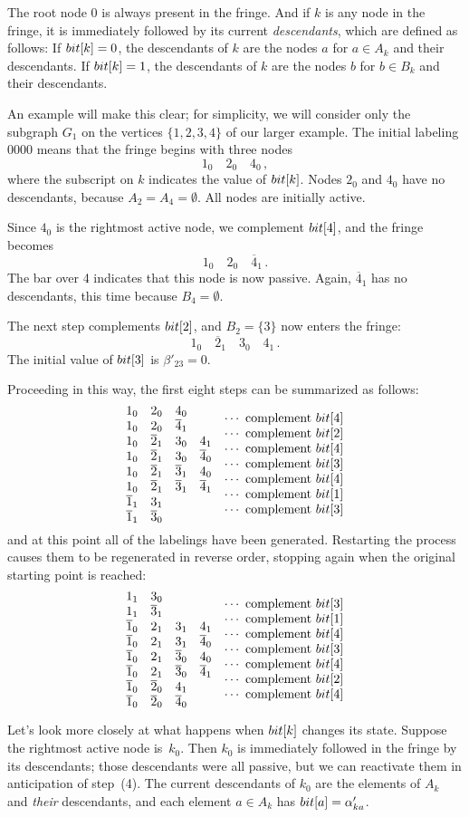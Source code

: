 The root node 0 is always present in the fringe.
And if $k$ is any node in the fringe, it is immediately followed
by its current {\it descendants}, which are defined as follows:
If $\\{bit}[k]=0$, the descendants of $k$ are the nodes $a$ for $a\in A_k$
and their descendants. If $\\{bit}[k]=1$, the descendants of $k$ are the nodes
$b$ for $b\in B_k$ and their descendants.

\fi

An example will make this clear; for simplicity, we will consider only
the subgraph $G_1$ on the vertices $\{1,2,3,4\}$ of our larger example.
The initial labeling 0000 means that the fringe begins with three nodes
$$1_0\quad 2_0\quad 4_0\,,$$
where the subscript on $k$ indicates the value of $\\{bit}[k]$. Nodes
$2_0$ and $4_0$ have no descendants, because $A_2=A_4=\emptyset$.
All nodes are initially active.

\def\p#1{\overline#1}
Since $4_0$ is the rightmost active node, we complement $\\{bit}[4]$, and
the fringe becomes
$$1_0\quad 2_0\quad \p4_1\,.$$
The bar over 4 indicates that this node is now passive. Again, $\p4_1$
has no descendants, this time because $B_4=\emptyset$.

The next step complements $\\{bit}[2]$, and $B_2=\{3\}$ now enters the fringe:
$$1_0\quad \p2_1\quad 3_0\quad 4_1\,.$$
The initial value of $\\{bit}[3]$ is $\beta'_{23}=0$.

\fi

Proceeding in this way,
the first eight steps can be summarized as follows:
$$\vbox{\halign{$#\hfil$&
\quad\smash{\lower.5\baselineskip\hbox{$\cdots$ complement $\bit#$\hfil}}\cr
1_0\quad 2_0\quad 4_0&4\cr
1_0\quad 2_0\quad \p4_1&2\cr
1_0\quad \p2_1\quad 3_0\quad 4_1&4\cr
1_0\quad \p2_1\quad 3_0\quad \p4_0&3\cr
1_0\quad \p2_1\quad \p3_1\quad 4_0&4\cr
1_0\quad \p2_1\quad \p3_1\quad \p4_1&1\cr
\p1_1\quad 3_1&3\cr
\p1_1\quad \p3_0\cr}}$$
and at this point all of the labelings have been generated.
Restarting the process causes
them to be regenerated in reverse order, stopping again when the original
starting point is reached:
$$\vbox{\halign{$#\hfil$&
\quad\smash{\lower.5\baselineskip\hbox{$\cdots$ complement $\bit#$\hfil}}\cr
1_1\quad 3_0&3\cr
1_1\quad \p3_1&1\cr
\p1_0\quad 2_1\quad 3_1\quad 4_1&4\cr
\p1_0\quad 2_1\quad 3_1\quad \p4_0&3\cr
\p1_0\quad 2_1\quad \p3_0\quad 4_0&4\cr
\p1_0\quad 2_1\quad \p3_0\quad \p4_1&2\cr
\p1_0\quad \p2_0\quad 4_1&4\cr
\p1_0\quad \p2_0\quad \p4_0\cr}}$$

\fi

Let's look more closely at what happens when $\\{bit}[k]$ changes its state.
Suppose the rightmost active node is~$k_0$. Then $k_0$ is immediately followed
in the fringe by its descendants; those descendants were all passive, but
we can reactivate them in anticipation of step~(4). The current descendants
of $k_0$ are the elements of $A_k$ and {\it their\/} descendants, and each
element $a\in A_k$ has $\\{bit}[a]=\alpha'_{ka}$.

